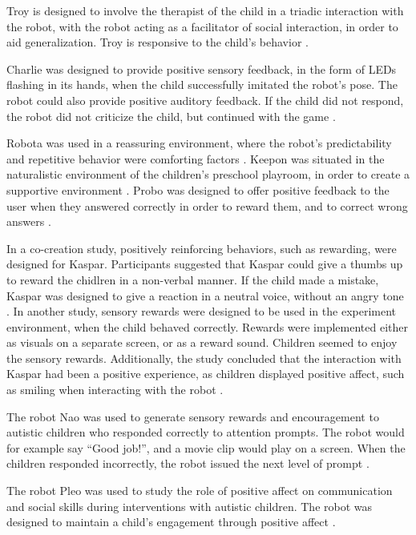 Troy is designed to involve the therapist of the child in a triadic interaction with the robot, with the robot acting as a facilitator of social interaction, in order to aid generalization. Troy is responsive to the child's behavior \cite{giullian2010detailed}.

Charlie was designed to provide positive sensory feedback, in the form of LEDs flashing in its hands, when the child successfully imitated the robot's pose. The robot could also provide positive auditory feedback. If the child did not respond, the robot did not criticize the child, but continued with the game \cite{charlie2011, boccanfuso2017low}. 

Robota was used in a reassuring environment, where the robot's predictability and repetitive behavior were comforting factors \cite{robins2004effects}. Keepon was situated in the naturalistic environment of the children's preschool playroom, in order to create a supportive environment \cite{kozima2009keepon}. Probo was designed to offer positive feedback to the user when they answered correctly in order to reward them, and to correct wrong answers \cite{pop2013social}.

In a co-creation study, positively reinforcing behaviors, such as rewarding, were designed for Kaspar. Participants suggested that Kaspar could give a thumbs up to reward the chidlren in a non-verbal manner.  If the child made a mistake, Kaspar was designed to give a reaction in a neutral voice, without an angry tone \cite{huijnen2017implement}. In another study, sensory rewards were designed to be used in the experiment environment, when the child behaved correctly. Rewards were implemented either as visuals on a separate screen, or as a reward sound. Children seemed to enjoy the sensory rewards. Additionally, the study concluded that the interaction with Kaspar had been a positive experience, as children displayed positive affect, such as smiling when interacting with the robot \cite{wainer2014pilot}.

The robot Nao was used to generate sensory rewards and encouragement to autistic children who responded correctly to attention prompts. The robot would for example say ``Good job!'', and a movie clip would play on a screen. When the children responded incorrectly, the robot issued the next level of prompt \cite{ARIA}.

The robot Pleo was used to study the role of positive affect on communication and social skills during interventions with autistic children. The robot was designed to maintain a child's engagement through positive affect \cite{kim2015potential}.


